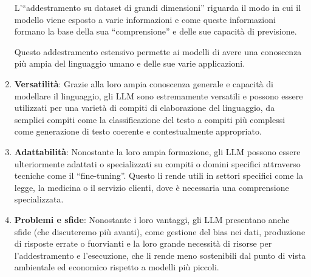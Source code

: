 \begin{enumerate}
                    L'``addestramento su dataset di grandi dimensioni'' riguarda il modo in cui il modello viene esposto a varie informazioni e come queste informazioni formano la base della sua ``comprensione'' e delle sue capacità di previsione.
                    
                    Questo addestramento estensivo permette ai modelli di avere una conoscenza più ampia del linguaggio umano e delle sue varie applicazioni.

                \item
                    \textbf{Versatilità}: Grazie alla loro ampia conoscenza generale e capacità di modellare il linguaggio, gli LLM sono estremamente versatili e possono essere utilizzati per una varietà di compiti di elaborazione del linguaggio, da semplici compiti come la classificazione del testo a compiti più complessi come generazione di testo coerente e contestualmente appropriato.

                \item
                    \textbf{Adattabilità}: Nonostante la loro ampia formazione, gli LLM possono essere ulteriormente adattati o specializzati su compiti o domini specifici attraverso tecniche come il ``fine-tuning''. Questo li rende utili in settori specifici come la legge, la medicina o il servizio clienti, dove è necessaria una comprensione specializzata.

                \item
                    \textbf{Problemi e sfide}: Nonostante i loro vantaggi, gli LLM presentano anche sfide (che discuteremo più avanti), come gestione del bias nei dati, produzione di risposte errate o fuorvianti e la loro grande necessità di risorse per l'addestramento e l'esecuzione, che li rende meno sostenibili dal punto di vista ambientale ed economico rispetto a modelli più piccoli.
            \end{enumerate}
             

